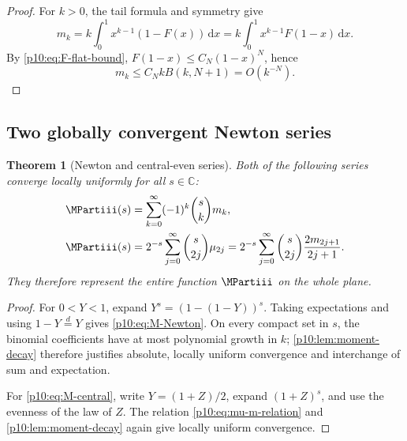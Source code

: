 \documentclass[11pt,oneside]{article}
\newtheorem{theorem}{Theorem}[section]
\theoremstyle{definition}
\theoremstyle{remark}
\newcommand{\F}{F}
\newcommand{\C}{\mathbb C}
\newcommand{\dd}{\,\mathrm d}
\newcommand{\1}{\mathbf 1}
\begin{document}
\begin{proof}
For \(k>0\), the tail formula and symmetry give
\[
 m_k=k\int_0^1x^{k-1}(1-\F(x))\dd x
 =k\int_0^1x^{k-1}\F(1-x)\dd x.
\]
By \cref{p10:eq:F-flat-bound}, \(\F(1-x)\le C_N(1-x)^N\), hence
\[
 m_k\le C_N kB(k,N+1)=O(k^{-N}).
\]
\end{proof}

\subsection{Two globally convergent Newton series}

\begin{theorem}[Newton and central-even series]\label{p10:thm:newton}
Both of the following series converge locally uniformly for all \(s\in\C\):
\begin{align}
 \MPartiii(s)&=\sum_{k=0}^{\infty}(-1)^k\binom{s}{k}m_k,
 \label{p10:eq:M-Newton}\\
 \MPartiii(s)&=2^{-s}\sum_{j=0}^{\infty}\binom{s}{2j}\mu_{2j}
 =2^{-s}\sum_{j=0}^{\infty}\binom{s}{2j}\frac{2m_{2j+1}}{2j+1}.
 \label{p10:eq:M-central}
\end{align}
They therefore represent the entire function \(\MPartiii\) on the whole plane.
\end{theorem}

\begin{proof}
For \(0<Y<1\), expand
\(Y^s=(1-(1-Y))^s\).  Taking expectations and using
\(1-Y\overset d=Y\) gives \cref{p10:eq:M-Newton}.  On every compact set in \(s\), the
binomial coefficients have at most polynomial growth in \(k\); \cref{p10:lem:moment-decay}
therefore justifies absolute, locally uniform convergence and interchange of sum and
expectation.

For \cref{p10:eq:M-central}, write \(Y=(1+Z)/2\), expand \((1+Z)^s\), and use the
evenness of the law of \(Z\).  The relation \cref{p10:eq:mu-m-relation} and
\cref{p10:lem:moment-decay} again give locally uniform convergence.
\end{proof}
\end{document}
